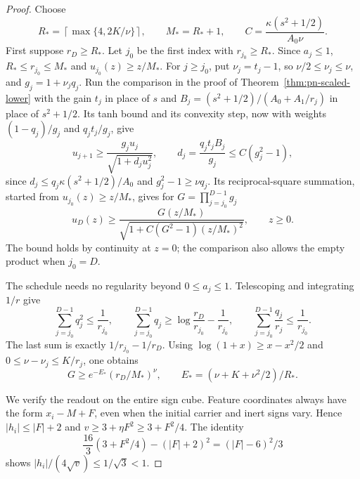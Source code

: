 \begin{proof}
Choose
\[
 R_*=\left\lceil\max\{4,2K/\nu\}\right\rceil,
 \qquad M_*=R_*+1,
 \qquad C=\frac{\kappa(s^2+1/2)}{A_0\nu}.
\]
First suppose $r_D\ge R_*$. Let $j_0$ be the first index with
$r_{j_0}\ge R_*$. Since $a_j\le1$,
$R_*\le r_{j_0}\le M_*$ and $u_{j_0}(z)\ge z/M_*$.
For $j\ge j_0$, put $\nu_j=t_j-1$, so
$\nu/2\le\nu_j\le\nu$, and $g_j=1+\nu_jq_j$.
Run the comparison in the proof of Theorem~\ref{thm:pn-scaled-lower}
with the gain $t_j$ in place of $s$ and
$B_j=(s^2+1/2)/(A_0+A_1/r_j)$ in place of $s^2+1/2$. Its tanh bound
and its convexity step, now with weights $(1-q_j)/g_j$ and
$q_jt_j/g_j$, give
\[
 u_{j+1}\ge\frac{g_ju_j}{\sqrt{1+d_ju_j^2}},
 \qquad d_j=\frac{q_jt_jB_j}{g_j}
              \le C(g_j^2-1),
\]
since $d_j\le q_j\kappa(s^2+1/2)/A_0$ and $g_j^2-1\ge\nu q_j$.
Its reciprocal-square summation, started from
$u_{j_0}(z)\ge z/M_*$, gives for $G=\prod_{j=j_0}^{D-1}g_j$
\begin{equation}
 u_D(z)\ge
 \frac{G(z/M_*)}{\sqrt{1+C(G^2-1)(z/M_*)^2}},
 \qquad z\ge0.
 \label{eq:pn-normalized-gain-comparison}
\end{equation}
The bound holds by continuity at $z=0$; the comparison also
allows the empty product when $j_0=D$.

The schedule needs no regularity beyond $0\le a_j\le1$.
Telescoping and integrating $1/r$ give
\[
 \sum_{j=j_0}^{D-1}q_j^2\le\frac1{r_{j_0}},\qquad
 \sum_{j=j_0}^{D-1}q_j
       \ge\log\frac{r_D}{r_{j_0}}-\frac1{r_{j_0}},\qquad
 \sum_{j=j_0}^{D-1}\frac{q_j}{r_j}
       \le\frac1{r_{j_0}}.
\]
The last sum is exactly $1/r_{j_0}-1/r_D$. Using
$\log(1+x)\ge x-x^2/2$ and
$0\le\nu-\nu_j\le K/r_j$, one obtains
\[
 G\ge e^{-E_*}(r_D/M_*)^\nu,
 \qquad E_*=(\nu+K+\nu^2/2)/R_*.
\]

We verify the readout on the entire sign cube. Feature coordinates
always have the form $x_i-M+F$, even when the initial carrier and
inert signs vary. Hence $|h_i|\le |F|+2$ and
$v\ge3+\eta F^2\ge3+F^2/4$. The identity
\[
 \frac{16}{3}(3+F^2/4)-(|F|+2)^2
       =(|F|-6)^2/3
\]
shows $|h_i|/(4\sqrt v)\le1/\sqrt3<1$.


\end{proof}
